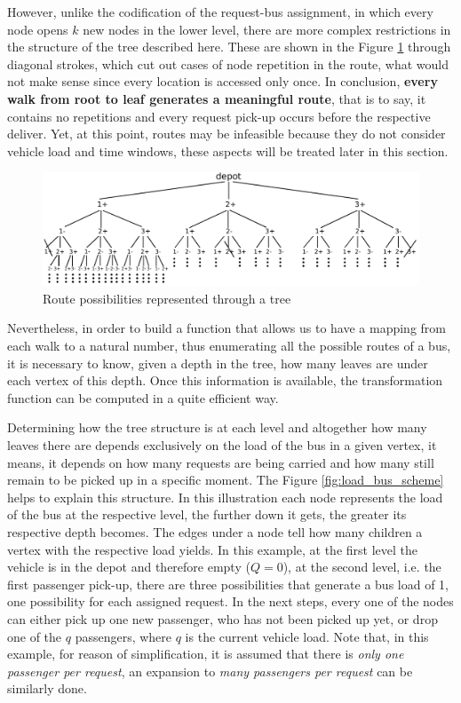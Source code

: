 \documentclass[tuberlin,cic,tc,openright,english,noabntcite,oneside]{iiufrgs}
\begin{document}
However, unlike the codification of the request-bus assignment, in which every node opens $k$ new nodes in the lower level, there are more complex restrictions in the structure of the tree described here. These are shown in the Figure \ref{fig:tree_bus_route} through diagonal strokes, which cut out cases of node repetition in the route, what would not make sense since every location is accessed only once. In conclusion, \textbf{every walk from root to leaf generates a meaningful route}, that is to say, it contains no repetitions and every request pick-up occurs before the respective deliver. Yet, at this point, routes may be infeasible because they do not consider vehicle load and time windows, these aspects will be treated later in this section.

\begin{figure}[H]
	\centering
    \caption{Route possibilities represented through a tree}
    \includegraphics[width=\textwidth]{fig_tree_bus_route}\par
    \label{fig:tree_bus_route}
\end{figure}

Nevertheless, in order to build a function that allows us to have a mapping from each walk to a natural number, thus enumerating all the possible routes of a bus, it is necessary to know, given a depth in the tree, how many leaves are under each vertex of this depth. Once this information is available, the transformation function can be computed in a quite efficient way.

Determining how the tree structure is at each level and altogether how many leaves there are depends exclusively on the load of the bus in a given vertex, it means, it depends on how many requests are being carried and how many still remain to be picked up in a specific moment. The Figure \ref{fig:load_bus_scheme} helps to explain this structure. In this illustration each node represents the load of the bus at the respective level, the further down it gets, the greater its respective depth becomes. The edges under a node tell how many children a vertex with the respective load yields. In this example, at the first level the vehicle is in the depot and therefore empty ($Q=0$), at the second level, i.e. the first passenger pick-up, there are three possibilities that generate a bus load of 1, one possibility for each assigned request. In the next steps, every one of the nodes can either pick up one new passenger, who has not been picked up yet, or drop one of the $q$ passengers, where $q$ is the current vehicle load. Note that, in this example, for reason of simplification, it is assumed that there is \emph{only one passenger per request}, an expansion to \emph{many passengers per request} can be similarly done.
\end{document}
